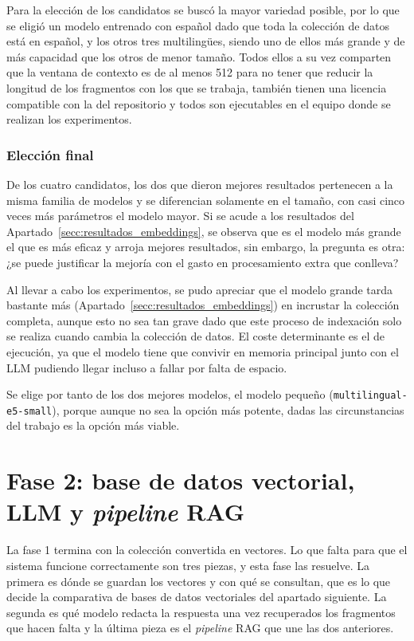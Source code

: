 Para la elección de los candidatos se buscó la mayor variedad posible, por lo que se eligió un modelo entrenado con español dado que toda la colección de datos está en español, y los otros tres multilingües, siendo uno de ellos más grande y de más capacidad que los otros de menor tamaño. Todos ellos a su vez comparten que la ventana de contexto es de al menos 512 para no tener que reducir la longitud de los fragmentos con los que se trabaja, también tienen una licencia compatible con la del repositorio y todos son ejecutables en el equipo donde se realizan los experimentos.


\subsubsection{Elección final}
\label{secc:eleccion_e5small}

De los cuatro candidatos, los dos que dieron mejores resultados pertenecen a la misma familia de modelos y se diferencian solamente en el tamaño, con casi cinco veces más parámetros el modelo mayor. Si se acude a los resultados del Apartado~\ref{secc:resultados_embeddings}, se observa que es el modelo más grande el que es más eficaz y arroja mejores resultados, sin embargo, la pregunta es otra: ¿se puede justificar la mejoría con el gasto en procesamiento extra que conlleva?

Al llevar a cabo los experimentos, se pudo apreciar que el modelo grande tarda bastante más (Apartado~\ref{secc:resultados_embeddings}) en incrustar la colección completa, aunque esto no sea tan grave dado que este proceso de indexación solo se realiza cuando cambia la colección de datos. El coste determinante es el de ejecución, ya que el modelo tiene que convivir en memoria principal junto con el LLM pudiendo llegar incluso a fallar por falta de espacio.

Se elige por tanto de los dos mejores modelos, el modelo pequeño (\texttt{multilingual-\allowbreak e5-small}), porque aunque no sea la opción más potente, dadas las circunstancias del trabajo es la opción más viable.
                                 
  

\section[Fase 2: base de datos vectorial, LLM y \textit{pipeline} RAG]{Fase 2: base de datos vectorial, LLM y \textit{pipeline} RAG}
\label{secc:fase2}


La fase 1 termina con la colección convertida en vectores. Lo que falta para que el sistema funcione correctamente son tres piezas, y esta fase las resuelve. La primera es dónde se guardan los vectores y con qué se consultan, que es lo que decide la comparativa de bases de datos vectoriales del apartado siguiente. La segunda es qué modelo redacta la respuesta una vez recuperados los fragmentos que hacen falta y la última pieza es el \textit{pipeline} RAG que une las dos anteriores.


